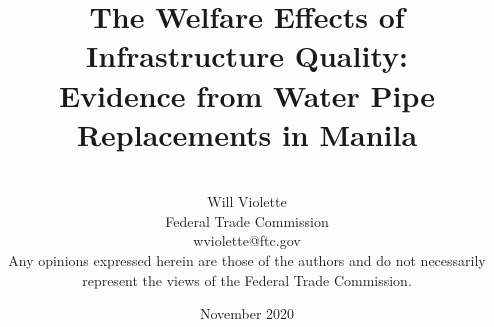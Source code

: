 \documentclass[aspectratio=32]{beamer}
\title{The Welfare Effects of Infrastructure Quality: \\ Evidence from Water Pipe Replacements in Manila} %
\author{\\Will Violette \\ Federal Trade Commission \\ wviolette@ftc.gov \\[2em] Any opinions expressed herein are those of the authors
and do not necessarily represent the views of the
Federal Trade Commission.}
\date{November 2020} %
\begin{document}
\beamertemplatenavigationsymbolsempty

\begin{frame}
\titlepage %
\end{frame}



\end{document}
